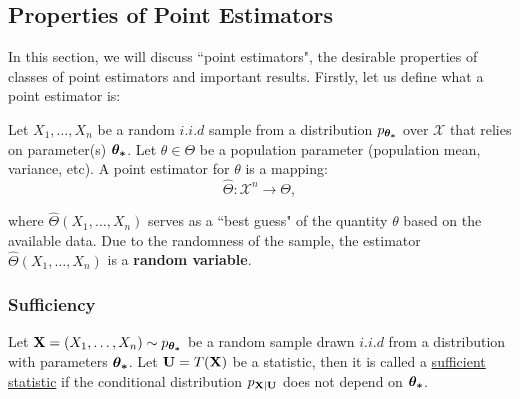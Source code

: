 \newcommand{\FacT}{\hyperref[thm:factorisation_theorem]{(\mathrm{{\bf FacT}})}}

\subsection{Properties of Point Estimators}
In this section, we will discuss ``point estimators", the desirable properties of classes of point estimators and important results. Firstly, let us define what a point estimator is:
\begin{definition}
    Let $X_1, \dots, X_n$ be a random $i.i.d$ sample from a distribution $p_{\boldsymbol{\theta_*}}$ over $\mathcal{X}$ that relies on parameter(s) $\boldsymbol{\theta_*}$. Let $\theta\in\Theta$ be a population parameter (population mean, variance, etc). A point estimator for $\theta$ is a mapping:
    \begin{equation}
        \widehat{\Theta}: \mathcal{X}^n \to \Theta,
    \end{equation}

    \noindent where $\widehat{\Theta}(X_1, \dots, X_n)$ serves as a ``best guess" of the quantity $\theta$ based on the available data. Due to the randomness of the sample, the estimator $\widehat\Theta(X_1, \dots, X_n)$ is a \textbf{random variable}.
\end{definition} 


\subsubsection{Sufficiency}
\begin{definition}
    Let ${\bf X} = (X_1, \dots, X_n) \sim p_{\boldsymbol{\theta_*}}$ be a random sample drawn $i.i.d$ from a distribution with parameters $\boldsymbol{\theta_*}$. Let ${\bf U}=T({\bf X})$ be a statistic, then it is called a \underline{sufficient statistic} if the conditional distribution $p_{{\bf X}|{\bf U}}$ does not depend on $\boldsymbol{\theta_*}$.
\end{definition}

